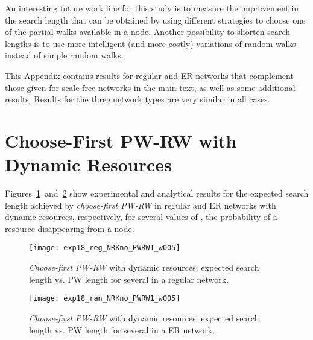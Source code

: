 \documentclass[]{elsarticle}
\begin{document}
An interesting future work line for this study is to measure the improvement in the search length that can be obtained by using different strategies to choose one of the partial walks available in a node. Another possibility to shorten search lengths is to use more intelligent (and more costly) variations of random walks instead of simple random walks.

\newpage





\newpage

\appendix

This Appendix contains results for regular and ER networks that complement those given for scale-free networks in the main text, as well as some additional results. Results for the three network types are very similar in all cases.

\section{Choose-First PW-RW with Dynamic Resources}

Figures~\ref{fig:regular_pw1}~and~\ref{fig:random_pw1} show experimental and analytical results for the expected search length achieved by \emph{choose-first PW-RW} in regular and ER networks with dynamic resources, respectively, for several values of , the probability of a resource disappearing from a node.

\begin{figure}[h]
 \centering
\texttt{[image: exp18\_reg\_NRKno\_PWRW1\_w005]}
 \caption{\emph{Choose-first PW-RW} with dynamic resources: expected search length  vs. PW length  for several  in a regular network.}
 \label{fig:regular_pw1}
\end{figure}

\begin{figure}[h]
 \centering
 \texttt{[image: exp18\_ran\_NRKno\_PWRW1\_w005]}
 \caption{\emph{Choose-first PW-RW} with dynamic resources: expected search length  vs. PW length  for several  in a ER network.}
 \label{fig:random_pw1}
\end{figure}
\end{document}
